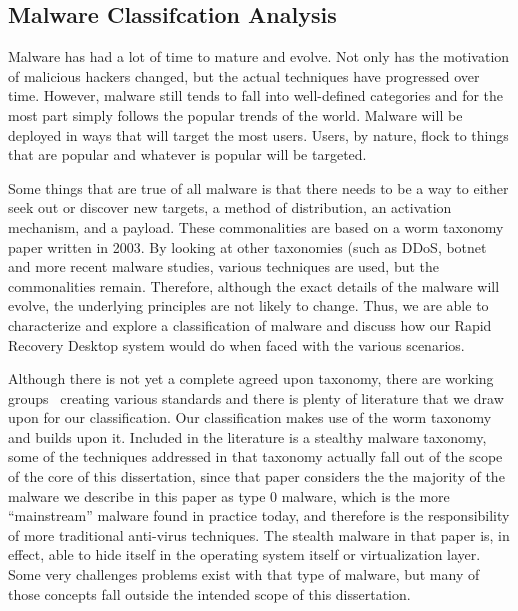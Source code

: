 \subsection{Malware Classifcation Analysis}

Malware has had a lot of time to mature and evolve. Not only has the motivation of malicious hackers changed, but the actual techniques have progressed over time. However, malware still tends to fall into well-defined categories and for the most part simply follows the popular trends of the world. Malware will be deployed in ways that will target the most users. Users, by nature, flock to things that are popular and whatever is popular will be targeted.

Some things that are true of all malware is that there needs to be a way to either seek out or discover new targets, a method of distribution, an activation mechanism, and a payload. These commonalities are based on a worm taxonomy paper\cite{worm_taxonomy_2003} written in 2003. By looking at other taxonomies (such as DDoS\cite{DDoS_taxonomy_2004}, botnet\cite{botnet_taxonomy_2005} and more recent malware studies\cite{leet09_malware}, various techniques are used, but the commonalities remain. Therefore, although the exact details of the malware will evolve, the underlying principles are not likely to change. Thus, we are able to characterize and explore a classification of malware and discuss how our Rapid Recovery Desktop system would do when faced with the various scenarios.

Although there is not yet a complete agreed upon taxonomy, there are working groups~\cite{maec_website,capec_website,IEEE-SA_malwale_working_group_website} creating various standards and there is plenty of literature\cite{worm_taxonomy_2003, DDoS_taxonomy_2004, botnet_taxonomy_2005, stealth_malware_taxonomy_2006} that we draw upon for our classification. Our classification makes use of the worm taxonomy and builds upon it. Included in the literature is a stealthy malware taxonomy, some of the techniques addressed in that taxonomy actually fall out of the scope of the core of this dissertation, since that paper considers the the majority of the malware we describe in this paper as type 0 malware, which is the more ``mainstream'' malware found in practice today, and therefore is the responsibility of more traditional anti-virus techniques. The stealth malware in that paper is, in effect, able to hide itself in the operating system itself or virtualization layer. Some very challenges problems exist with that type of malware, but many of those concepts fall outside the intended scope of this dissertation.

